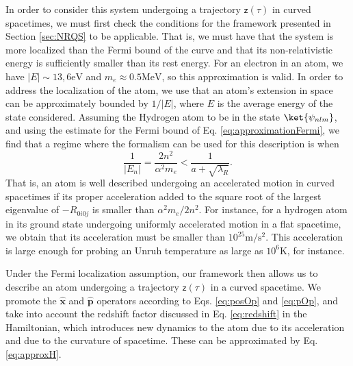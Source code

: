 \documentclass[letterpaper,12pt,titlepage,oneside,final]{book}
\newcommand{\mf}{\mathsf}%
\begin{document}
In order to consider this system undergoing a trajectory $\mf z(\tau)$ in curved spacetimes, we must first check the conditions for the framework presented in Section \ref{sec:NRQS} to be applicable. That is, we must have that the system is more localized than the Fermi bound of the curve and that its non-relativistic energy is sufficiently smaller than its rest energy. For an electron in an atom, we have $|E|\sim 13,6\text{eV}$ and $m_e \approx 0.5\text{MeV}$, so this approximation is valid. In order to address the localization of the atom, we use that an atom's extension in space can be approximately bounded by $1/|E|$, where $E$ is the average energy of the state considered. Assuming the Hydrogen atom to be in the state $\ket{\psi_{nlm}}$, and using the estimate for the Fermi bound of Eq. \eqref{eq:approximationFermi}, we find that a regime where the formalism can be used for this description is when
\begin{equation}
    \frac{1}{|E_n|} = \frac{2 n^2}{\alpha^2 m_e} < \frac{1}{a + \sqrt{\lambda_R}}.
\end{equation}
That is, an atom is well described undergoing an accelerated motion in curved spacetimes if its proper acceleration added to the square root of the largest eigenvalue of $-R_{0i0j}$ is smaller than $\alpha^2 m_e/2n^2$. For instance, for a hydrogen atom in its ground state undergoing uniformly accelerated motion in a flat spacetime, we obtain that its acceleration must be smaller than $10^{25}\text{m}/\text{s}^2$. This acceleration is large enough for probing an Unruh temperature as large as $10^6 \textrm{K}$, for instance.

Under the Fermi localization assumption, our framework then allows us to describe an atom undergoing a trajectory $\mf z(\tau)$ in a curved spacetime. We promote the $\hat{\bm x}$ and $\hat{\bm p}$ operators according to Eqs. \eqref{eq:posOp} and \eqref{eq:pOp}, and take into account the redshift factor discussed in Eq. \eqref{eq:redshift} in the Hamiltonian, which introduces new dynamics to the atom due to its acceleration and due to the curvature of spacetime. These can be approximated by Eq. \eqref{eq:approxH}.
\end{document}
